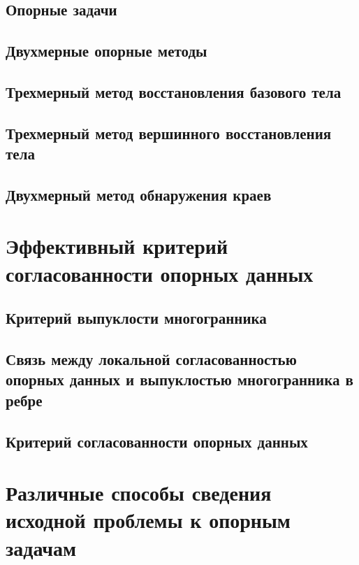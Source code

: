 \documentclass[a4paper, 12pt, titlepage]{article}
\theoremstyle{definition}
\theoremstyle{plain}
\theoremstyle{plain}
\begin{document}
\subsection{Опорные задачи}

\subsection{Двухмерные опорные методы}

\subsection{Трехмерный метод восстановления базового тела}

\subsection{Трехмерный метод вершинного восстановления тела}

\subsection{Двухмерный метод обнаружения краев}


\section{Эффективный критерий согласованности опорных данных}

\subsection{Критерий выпуклости многогранника}

\subsection{Связь между локальной согласованностью опорных данных и выпуклостью
многогранника в ребре}

\subsection{Критерий согласованности опорных данных}


\section{Различные способы сведения исходной проблемы к опорным задачам}
\end{document}
